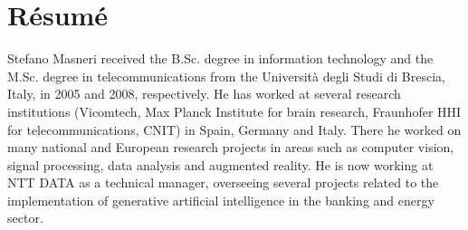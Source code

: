 \chapter{Résumé}

Stefano Masneri received the B.Sc. degree in information technology and the M.Sc. degree in telecommunications from the Università degli Studi di Brescia, Italy, in 2005 and 2008, respectively. He has worked at several research institutions (Vicomtech, Max Planck Institute for brain research, Fraunhofer HHI for telecommunications, CNIT) in Spain, Germany and Italy. There he worked on many national and European research projects in areas such as computer vision, signal processing, data analysis and augmented reality. He is now working at NTT DATA as a technical manager, overseeing several projects related to the implementation of generative artificial intelligence in the banking and energy sector.
